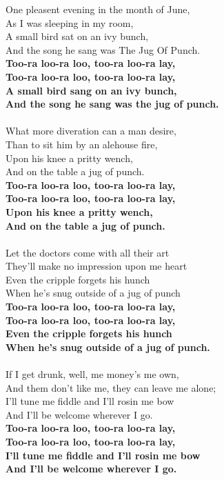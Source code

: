 One pleasent evening in the month of June,\\
As I was sleeping in my room,\\
A small bird sat on an ivy bunch,\\
And the song he sang was The Jug Of Punch.\\
\textbf{Too-ra loo-ra loo, too-ra loo-ra lay,\\
Too-ra loo-ra loo, too-ra loo-ra lay,\\
A small bird sang on an ivy bunch,\\
And the song he sang was the jug of punch.}\\
~\\
What more diveration can a man desire,\\
Than to sit him by an alehouse fire,\\
Upon his knee a pritty wench,\\
And on the table a jug of punch.\\
\textbf{Too-ra loo-ra loo, too-ra loo-ra lay,\\
Too-ra loo-ra loo, too-ra loo-ra lay,\\
Upon his knee a pritty wench,\\
And on the table a jug of punch.}\\
~\\
Let the doctors come with all their art\\
They'll make no impression upon me heart\\
Even the cripple forgets his hunch\\
When he's snug outside of a jug of punch\\
\textbf{Too-ra loo-ra loo, too-ra loo-ra lay,\\
Too-ra loo-ra loo, too-ra loo-ra lay,\\
Even the cripple forgets his hunch\\
When he's snug outside of a jug of punch.}\\
~\\
If I get drunk, well, me money's me own,\\
And them don't like me, they can leave me alone;\\
I'll tune me fiddle and I'll rosin me bow\\
And I'll be welcome wherever I go.\\
\textbf{Too-ra loo-ra loo, too-ra loo-ra lay,\\
Too-ra loo-ra loo, too-ra loo-ra lay,\\
I'll tune me fiddle and I'll rosin me bow\\
And I'll be welcome wherever I go.}\\
